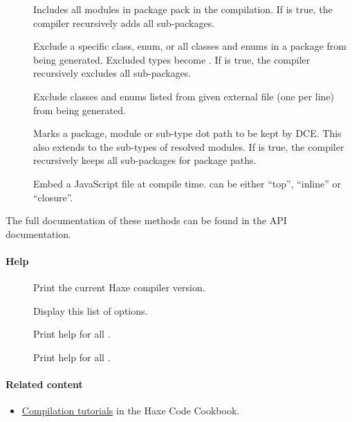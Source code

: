 \begin{description}
	\item[] 
		Includes all modules in package pack in the compilation. If  is true, the compiler recursively adds all sub-packages.
	\item[] 
		Exclude a specific class, enum, or all classes and enums in a package from being generated. Excluded types become . If  is true, the compiler recursively excludes all sub-packages.
	\item[] 
		Exclude classes and enums listed from given external file (one per line) from being generated.
	\item[] 
		Marks a package, module or sub-type dot path to be kept by DCE. This also extends to the sub-types of resolved modules. If  is true, the compiler recursively keeps all sub-packages for package paths.
	\item[] 
		Embed a JavaScript file at compile time.  can be either ``top'', ``inline'' or ``closure''.
\end{description}

The full documentation of these methods can be found in the \href{http://api.haxe.org/haxe/macro/Compiler.html}{} API documentation.

\paragraph{Help}

\begin{description}
	\item[] Print the current Haxe compiler version.
	\item[] Display this list of options.
	\item[] Print help for all .
	\item[] Print help for all .
\end{description}

\paragraph{Related content}
\begin{itemize}
	\item \href{http://code.haxe.org/category/compilation/}{Compilation tutorials} in the Haxe Code Cookbook.
\end{itemize}


